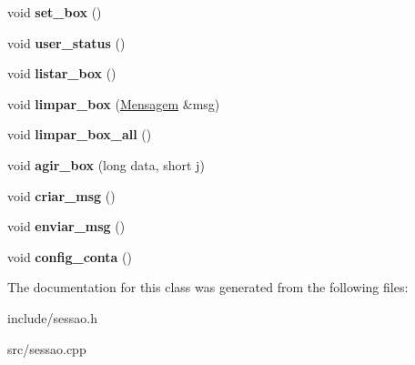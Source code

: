 \begin{DoxyCompactItemize}
void {\bfseries set\+\_\+box} ()
\item 
\mbox{\label{class_sessao_a20cee7fb2a66df2453d3f7302fa875a7}} 
void {\bfseries user\+\_\+status} ()
\item 
\mbox{\label{class_sessao_a6293b1b34f23701248419356bc573dac}} 
void {\bfseries listar\+\_\+box} ()
\item 
\mbox{\label{class_sessao_ac7612aba37ac681aaa25772665586468}} 
void {\bfseries limpar\+\_\+box} (\mbox{\hyperlink{class_mensagem}{Mensagem}} \&msg)
\item 
\mbox{\label{class_sessao_a9b53af613e0fcc718363578929817cfd}} 
void {\bfseries limpar\+\_\+box\+\_\+all} ()
\item 
\mbox{\label{class_sessao_a34d14a646d7c8055101cb9ae5af79232}} 
void {\bfseries agir\+\_\+box} (long data, short j)
\item 
\mbox{\label{class_sessao_a1f2ef598d32269eafb888dac03b8f033}} 
void {\bfseries criar\+\_\+msg} ()
\item 
\mbox{\label{class_sessao_ab66939df9953ada04fc768589a7c7239}} 
void {\bfseries enviar\+\_\+msg} ()
\item 
\mbox{\label{class_sessao_a112278b86d8302454d67690b68f3cc0c}} 
void {\bfseries config\+\_\+conta} ()
\end{DoxyCompactItemize}


The documentation for this class was generated from the following files\+:\begin{DoxyCompactItemize}
\item 
include/sessao.\+h\item 
src/sessao.\+cpp\end{DoxyCompactItemize}
